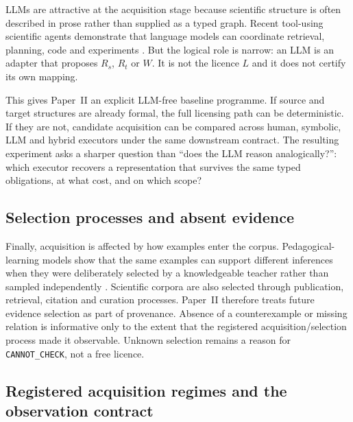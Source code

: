 LLMs are attractive at the acquisition stage because scientific structure is often described in prose rather than supplied as a typed graph. Recent tool-using scientific agents demonstrate that language models can coordinate retrieval, planning, code and experiments \cite{boiko2023coscientist,bran2024chemcrow,gottweis2026coscientist}. But the logical role is narrow: an LLM is an adapter that proposes $R_s$, $R_t$ or $W$. It is not the licence $L$ and it does not certify its own mapping.

This gives Paper~II an explicit LLM-free baseline programme. If source and target structures are already formal, the full licensing path can be deterministic. If they are not, candidate acquisition can be compared across human, symbolic, LLM and hybrid executors under the same downstream contract. The resulting experiment asks a sharper question than ``does the LLM reason analogically?'': which executor recovers a representation that survives the same typed obligations, at what cost, and on which scope?

\subsection{Selection processes and absent evidence}

Finally, acquisition is affected by how examples enter the corpus. Pedagogical-learning models show that the same examples can support different inferences when they were deliberately selected by a knowledgeable teacher rather than sampled independently \cite{shafto2014pedagogy}. Scientific corpora are also selected through publication, retrieval, citation and curation processes. Paper~II therefore treats future evidence selection as part of provenance. Absence of a counterexample or missing relation is informative only to the extent that the registered acquisition/selection process made it observable. Unknown selection remains a reason for \texttt{CANNOT\_CHECK}, not a free licence.

\subsection{Registered acquisition regimes and the observation contract}
\label{sec:registered-acquisition-regimes}

